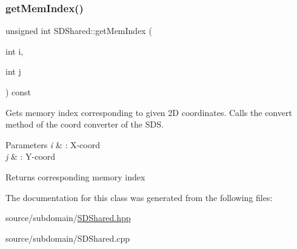 \subsubsection{\texorpdfstring{get\+Mem\+Index()}{getMemIndex()}\hspace{0.1cm}{\footnotesize\ttfamily [2/2]}}
{\footnotesize\ttfamily unsigned int S\+D\+Shared\+::get\+Mem\+Index (\begin{DoxyParamCaption}\item[{int}]{i,  }\item[{int}]{j }\end{DoxyParamCaption}) const}



Gets memory index corresponding to given 2D coordinates. Calls the convert method of the coord converter of the S\+DS. 


\begin{DoxyParams}{Parameters}
{\em i} & \+: X-\/coord \\
\hline
{\em j} & \+: Y-\/coord\\
\hline
\end{DoxyParams}
\begin{DoxyReturn}{Returns}
corresponding memory index 
\end{DoxyReturn}


The documentation for this class was generated from the following files\+:\begin{DoxyCompactItemize}
\item 
source/subdomain/\hyperlink{source_2subdomain_2SDShared_8hpp}{S\+D\+Shared.\+hpp}\item 
source/subdomain/S\+D\+Shared.\+cpp\end{DoxyCompactItemize}
